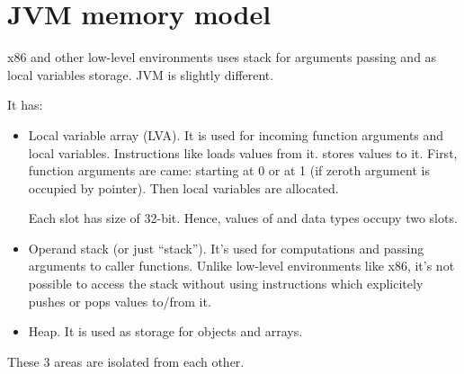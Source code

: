 \section{\ac{JVM} memory model}

x86 and other low-level environments uses stack for arguments passing and 
as local variables storage.
\ac{JVM} is slightly different.

It has: 

\begin{itemize}
\item Local variable array (\ac{LVA}).
It is used for incoming function arguments and local variables.
Instructions like  loads values from it.
 stores values to it.
First, function arguments are came: starting at 0 or at 1 
(if zeroth argument is occupied by  pointer).
Then local variables are allocated.

Each slot has size of 32-bit. Hence, values of  and  data types 
occupy two slots.

\item Operand stack (or just ``stack''). 
It's used for computations and passing arguments to caller functions.
Unlike low-level environments like x86, it's not possible to access the stack without using
instructions which explicitely pushes or pops values to/from it.

\item Heap. It is used as storage for objects and arrays.
\end{itemize}

These 3 areas are isolated from each other.
